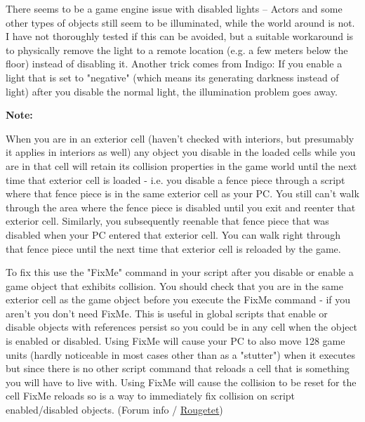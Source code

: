 \documentclass[
]{article}
\begin{document}
There seems to be a game engine issue with disabled lights -- Actors and
some other types of objects still seem to be illuminated, while the
world around is not. I have not thoroughly tested if this can be
avoided, but a suitable workaround is to physically remove the light to
a remote location (e.g. a few meters below the floor) instead of
disabling it. Another trick comes from Indigo: If you enable a light
that is set to "negative" (which means its generating darkness instead
of light) after you disable the normal light, the illumination problem
goes away.

\textbf{Note:}

When you are in an exterior cell (haven't checked with interiors, but
presumably it applies in interiors as well) any object you disable in
the loaded cells while you are in that cell will retain its collision
properties in the game world until the next time that exterior cell is
loaded - i.e. you disable a fence piece through a script where that
fence piece is in the same exterior cell as your PC. You still can't
walk through the area where the fence piece is disabled until you exit
and reenter that exterior cell. Similarly, you subsequently reenable
that fence piece that was disabled when your PC entered that exterior
cell. You can walk right through that fence piece until the next time
that exterior cell is reloaded by the game.

To fix this use the "FixMe" command in your script after you disable or
enable a game object that exhibits collision. You should check that you
are in the same exterior cell as the game object before you execute the
FixMe command - if you aren't you don't need FixMe. This is useful in
global scripts that enable or disable objects with references persist so
you could be in any cell when the object is enabled or disabled. Using
FixMe will cause your PC to also move 128 game units (hardly noticeable
in most cases other than as a "stutter") when it executes but since
there is no other script command that reloads a cell that is something
you will have to live with. Using FixMe will cause the collision to be
reset for the cell FixMe reloads so is a way to immediately fix
collision on script enabled/disabled objects. (Forum info /
\href{http://www.bethsoft.com/bgsforums/index.php?showuser=370208}{Rougetet})

\hypertarget{section-5}{%
\subsubsection{}\label{section-5}}
\end{document}
